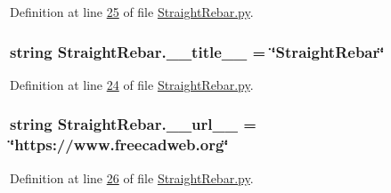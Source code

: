 Definition at line \hyperlink{StraightRebar_8py_source_l00025}{25} of file \hyperlink{StraightRebar_8py_source}{Straight\+Rebar.\+py}.

\subsubsection[{\texorpdfstring{\+\_\+\+\_\+title\+\_\+\+\_\+}{__title__}}]{\setlength{\rightskip}{0pt plus 5cm}string Straight\+Rebar.\+\_\+\+\_\+title\+\_\+\+\_\+ = \char`\"{}Straight\+Rebar\char`\"{}\hspace{0.3cm}{\ttfamily [private]}}\hypertarget{namespaceStraightRebar_ab1d45eb17133c23d9d6a3e2a6f2abb8a}{}\label{namespaceStraightRebar_ab1d45eb17133c23d9d6a3e2a6f2abb8a}


Definition at line \hyperlink{StraightRebar_8py_source_l00024}{24} of file \hyperlink{StraightRebar_8py_source}{Straight\+Rebar.\+py}.

\subsubsection[{\texorpdfstring{\+\_\+\+\_\+url\+\_\+\+\_\+}{__url__}}]{\setlength{\rightskip}{0pt plus 5cm}string Straight\+Rebar.\+\_\+\+\_\+url\+\_\+\+\_\+ = \char`\"{}https\+://www.\+freecadweb.\+org\char`\"{}\hspace{0.3cm}{\ttfamily [private]}}\hypertarget{namespaceStraightRebar_aebf23f453d8fabed3a611d14f5e7f057}{}\label{namespaceStraightRebar_aebf23f453d8fabed3a611d14f5e7f057}


Definition at line \hyperlink{StraightRebar_8py_source_l00026}{26} of file \hyperlink{StraightRebar_8py_source}{Straight\+Rebar.\+py}.

